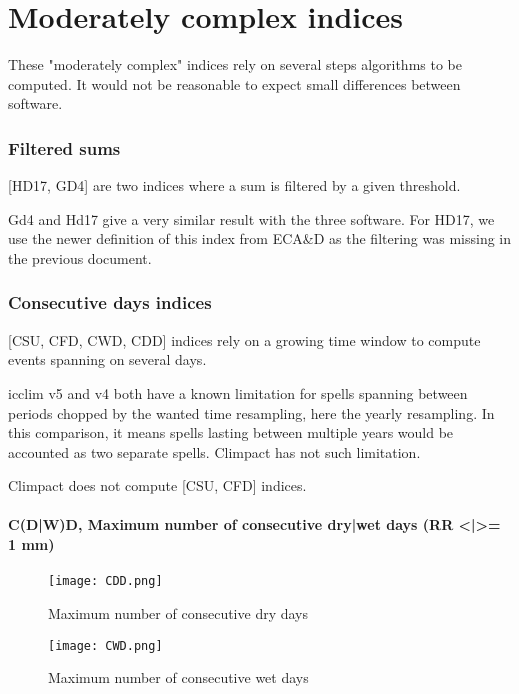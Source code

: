 \documentclass[a4paper,11pt]{article}
\begin{document}
\part{Moderately complex indices}
    These "moderately complex" indices rely on several steps algorithms to be computed.
    It would not be reasonable to expect small differences between software.

    \section{Filtered sums}
        [HD17, GD4] are two indices where a sum is filtered by a given threshold.

        Gd4 and Hd17 give a very similar result with the three software.
        For HD17, we use the newer definition of this index from ECA\&D \cite{doc/ecad_new} as the filtering was missing in the previous document.

    \section{Consecutive days indices} \label{section/consecutive_days}
        [CSU, CFD, CWD, CDD] indices rely on a growing time window to compute events spanning on several days.

        icclim v5 and v4 both have a known limitation for spells spanning between periods chopped by the wanted time resampling, here the yearly resampling.
        In this comparison, it means spells lasting between multiple years would be accounted as two separate spells.
        Climpact has not such limitation.

        Climpact does not compute [CSU, CFD] indices.

        \subsection{C(D|W)D, Maximum number of consecutive dry|wet days (RR <|>= 1 mm)}
            \begin{figure}[h]
                \centering
                \texttt{[image: CDD.png]}
                \caption{Maximum number of consecutive dry days}
                \label{figure/cdd}
            \end{figure}
            \begin{figure}[h]
                \centering
                \texttt{[image: CWD.png]}
                \caption{Maximum number of consecutive wet days}
                \label{figure/cwd}
            \end{figure}
\end{document}
